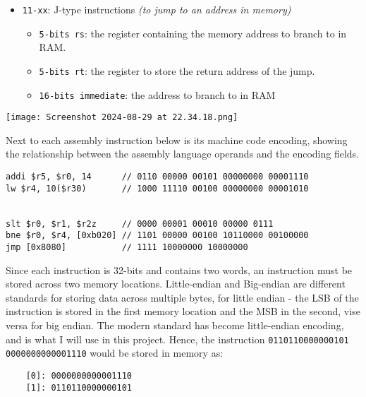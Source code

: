 \begin{itemize}
\begin{itemize}
        \end{itemize}
    \item \texttt{11-xx}: J-type instructions \textit{(to jump to an address in memory)}
        \begin{itemize}
            \item \texttt{5-bits rs}: the register containing the memory address to branch to in RAM.
            \item \texttt{5-bits rt}: the register to store the return address of the jump.
            \item \texttt{16-bits immediate}: the address to branch to in RAM
        \end{itemize}
\end{itemize}
 
\bigskip

\begin{center}
\texttt{[image: Screenshot 2024-08-29 at 22.34.18.png]}
\end{center}

\bigskip

Next to each assembly instruction below is its machine code encoding, showing the relationship between the assembly language operands and the encoding fields. 

\begin{lstlisting}
addi $r5, $r0, 14      // 0110 00000 00101 00000000 00001110
lw $r4, 10($r30)       // 1000 11110 00100 00000000 00001010


slt $r0, $r1, $r2z     // 0000 00001 00010 00000 0111 
bne $r0, $r4, [0xb020] // 1101 00000 00100 10110000 00100000
jmp [0x8080]           // 1111 10000000 10000000
\end{lstlisting}

Since each instruction is 32-bits and contains two words, an instruction must be stored across two memory locations. Little-endian and Big-endian are different standards for storing data across multiple bytes, for little endian - the LSB of the instruction is stored in the first memory location and the MSB in the second, vise versa for big endian. The modern standard has become little-endian encoding, and is what I will use in this project. Hence, the instruction \texttt{0110110000000101 0000000000001110} would be stored in memory as:

\begin{lstlisting}
    [0]: 0000000000001110
    [1]: 0110110000000101 
\end{lstlisting}

